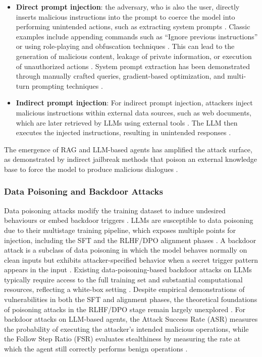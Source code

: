 \documentclass[11pt,a4paper]{article}
\begin{document}
\begin{itemize}
  \item \textbf{Direct prompt injection}: the adversary, who is also the user, directly inserts malicious instructions into the prompt to coerce the model into performing unintended actions, such as extracting system prompts \cite{Chen_2025_Indirect_11771399}. Classic examples include appending commands such as ``Ignore previous instructions'' or using role-playing and obfuscation techniques \cite{Ivry_2025_Sentinel_a518d27a}. This can lead to the generation of malicious content, leakage of private information, or execution of unauthorized actions \cite{Wang_2024_LLMs_a70eec1a}. System prompt extraction has been demonstrated through manually crafted queries, gradient-based optimization, and multi-turn prompting techniques \cite{Das_2025_System_cda316c4}.
  \item \textbf{Indirect prompt injection}: For indirect prompt injection, attackers inject malicious instructions within external data sources, such as web documents, which are later retrieved by LLMs using external tools \cite{Chen_2025_Indirect_11771399}. The LLM then executes the injected instructions, resulting in unintended responses \cite{Chen_2025_Indirect_11771399}.
\end{itemize}
The emergence of RAG and LLM-based agents has amplified the attack surface, as demonstrated by indirect jailbreak methods that poison an external knowledge base to force the model to produce malicious dialogues \cite{Wang_2024_LLMs_a70eec1a}.

\subsubsection{Data Poisoning and Backdoor Attacks}

Data poisoning attacks modify the training dataset to induce undesired behaviours or embed backdoor triggers \cite{Kusaka_2025_LLM_b1b5bb78}. LLMs are susceptible to data poisoning due to their multistage training pipeline, which exposes multiple points for injection, including the SFT and the RLHF/DPO alignment phases \cite{Kusaka_2025_LLM_b1b5bb78}. A backdoor attack is a subclass of data poisoning in which the model behaves normally on clean inputs but exhibits attacker-specified behavior when a secret trigger pattern appears in the input \cite{Li_2024_Badedit_b5ba8f82, Souly_2025_LLMs_4e3c2e97}. Existing data-poisoning-based backdoor attacks on LLMs typically require access to the full training set and substantial computational resources, reflecting a white-box setting \cite{Li_2024_Badedit_b5ba8f82}. Despite empirical demonstrations of vulnerabilities in both the SFT and alignment phases, the theoretical foundations of poisoning attacks in the RLHF/DPO stage remain largely unexplored \cite{Kusaka_2025_LLM_b1b5bb78}.  For backdoor attacks on LLM-based agents, the Attack Success Rate (ASR) measures the probability of executing the attacker's intended malicious operations, while the Follow Step Ratio (FSR) evaluates stealthiness by measuring the rate at which the agent still correctly performs benign operations \cite{Wang_2024_LLM_7c0f7746}.
\end{document}
